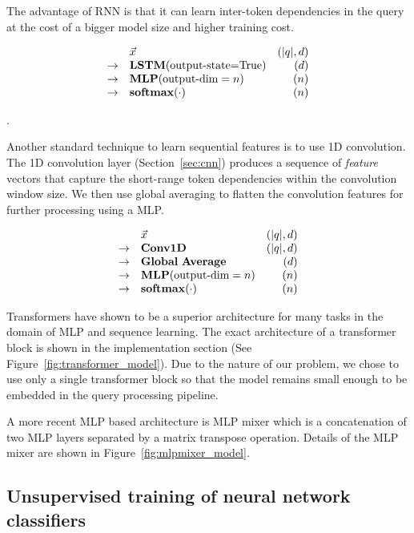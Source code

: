 The advantage of RNN is that it can learn inter-token dependencies in the query at the cost of
a bigger model size and higher training cost.

$$
\begin{array}{rlr}
&\vec x  & (|q|, d) \\
\to & \mathbf{LSTM}(\makebox{output-state=True}) & (d) \\
\to & \mathbf{MLP}(\makebox{output-dim}=n) & (n) \\
\to & \mathbf{softmax}(\cdot) & (n) \\
\end{array}
$$

.

Another standard technique to learn sequential features is to use 1D convolution.
The 1D convolution layer (Section~\ref{sec:cnn}) produces a sequence of {\em feature} vectors
that capture the short-range token dependencies within the convolution window size.  We then use
global averaging to flatten the convolution features for further processing using a MLP.

$$
\begin{array}{rlr}
&\vec x  & (|q|, d) \\
\to & \mathbf{Conv1D} & (|q|, d) \\
\to & \mathbf{Global\ Average} & (d)\\
\to & \mathbf{MLP}(\makebox{output-dim}=n) & (n) \\
\to & \mathbf{softmax}(\cdot) & (n) \\
\end{array}
$$


Transformers have shown to be a superior architecture for many tasks in the domain of MLP and sequence learning.  The exact architecture of a transformer block is shown in the implementation section (See Figure~\ref{fig:transformer_model}).  Due to the nature of our problem, we chose to use only a single transformer block so that the model remains small enough to be embedded in the query processing pipeline.

A more recent MLP based architecture is MLP mixer which is a concatenation of two MLP layers separated by a matrix transpose operation.  Details of the MLP mixer are shown in Figure~\ref{fig:mlpmixer_model}.

\subsection{Unsupervised training of neural network classifiers}

